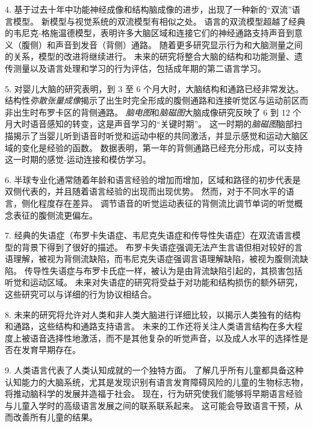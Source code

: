 4. 基于过去十年中功能神经成像和结构脑成像的进步，出现了一种新的“双流”语言模型。
新模型与视觉系统的双流模型有相似之处。
语言的双流模型超越了经典的韦尼克-格施温德模型，表明许多大脑区域和连接它们的神经通路支持声音到意义（腹侧）和声音到发音（背侧）通路。
随着更多研究显示行为和大脑测量之间的关系，模型的改进将继续进行。
未来的研究将整合大脑的结构和功能测量、遗传测量以及语言处理和学习的行为评估，包括成年期的第二语言学习。


5. 对婴儿大脑的研究表明，到 3 至 6 个月大时，大脑结构和通路已经非常发达。
结构性\textit{弥散张量成像}揭示了出生时完全形成的腹侧通路和连接听觉区与运动前区而非出生时布罗卡区的背侧通路。
\textit{脑电图}和\textit{脑磁图}大脑成像研究反映了 6 到 12 个月大时语音感知的转变，这是声音学习的“关键时期”。
这一时期的\textit{脑磁图}脑部扫描揭示了当婴儿听到语音时听觉和运动中枢的共同激活，并显示感觉和运动大脑区域的变化是经验的函数。
数据表明，第一年的背侧通路已经充分形成，可以支持这一时期的感觉-运动连接和模仿学习。


6. 半球专业化通常随着年龄和语言经验的增加而增加，区域和路径的初步代表是双侧代表的，并且随着语言经验的出现而出现优势。
然而，对于不同水平的语言，侧化程度存在差异。
调节语音的听觉运动表征的背侧流比调节单词的听觉概念表征的腹侧流更偏左。


7. 经典的失语症（布罗卡失语症、韦尼克失语症和传导性失语症）在双流语言模型的背景下得到了很好的描述。
布罗卡失语症强调无法产生言语但相对较好的言语理解，被视为背侧流缺陷，而韦尼克失语症强调言语理解缺陷，被视为腹侧流缺陷。
传导性失语症与布罗卡氏症一样，被认为是由背流缺陷引起的，其损害包括听觉和运动区域。
未来对失语症的研究将受益于对功能和结构损伤的额外研究，这些研究可以与详细的行为协议相结合。 


8. 未来的研究将允许对人类和非人类大脑进行详细比较，以揭示人类独有的结构和通路，这些结构和通路支持语言。
未来的工作还将关注人类语言结构在多大程度上被语音选择性地激活，而不是其他复杂的听觉声音，以及成人水平的选择性是否在发育早期存在。 


9. 人类语言代表了人类认知成就的一个独特方面。
了解几乎所有儿童都具备这种认知能力的大脑系统，尤其是发现识别有语言发育障碍风险的儿童的生物标志物，将推动脑科学的发展并造福于社会。
现在，行为研究使我们能够将早期语言经验与儿童入学时的高级语言发展之间的联系联系起来。
这可能会导致语言干预，从而改善所有儿童的结果。



